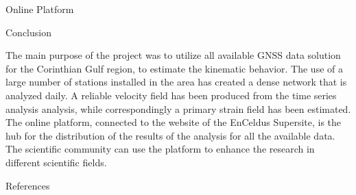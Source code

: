 \documentclass[final,a0,portrait]{beamer}
\newlength{\onecolwid}
\begin{document}
\begin{frame}[t]
\begin{columns}[t]
\begin{column}{\onecolwid}
\begin{block}{Online Platform}
\end{block}



\begin{block}{Conclusion}
{\small
The main purpose of the project was to utilize all available GNSS data solution for the Corinthian Gulf region, to estimate the kinematic behavior.
The use of a large number of stations installed in the area has created a dense network that is analyzed daily.
A reliable velocity field has been produced from the time series analysis analysis, while correspondingly a primary strain field has been estimated.
The online platform, connected to the website of the EnCeldus Supersite, is the hub for the distribution of the results of the analysis for all the available data. The scientific community can use the platform to enhance the research in different scientific fields.

}
\end{block}


\begin{block}{References}

\nocite{*} %
\footnotesize{
\vspace{0.75in}}


\end{block}




\end{column} %

\end{columns} %

\end{frame} %
\end{document}
